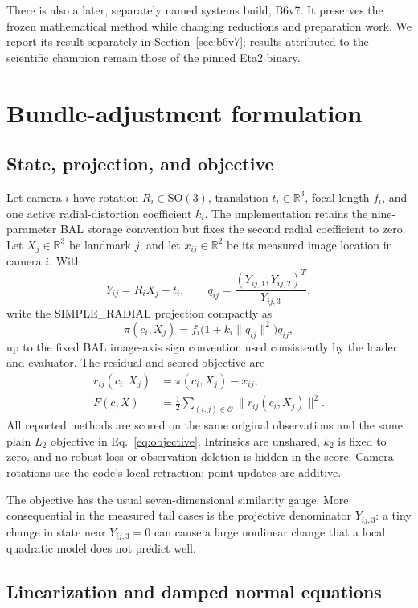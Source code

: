 \documentclass[10pt]{article}
\newcommand{\R}{\mathbb{R}}
\newcommand{\Oset}{\mathcal{O}}
\begin{document}
There is also a later, separately named systems build, B6v7.  It preserves the frozen mathematical method while changing reductions and preparation work.  We report its result separately in Section~\ref{sec:b6v7}; results attributed to the scientific champion remain those of the pinned Eta2 binary.

\section{Bundle-adjustment formulation}

\subsection{State, projection, and objective}

Let camera $i$ have rotation $R_i\in\mathrm{SO}(3)$, translation $t_i\in\R^3$, focal length $f_i$, and one active radial-distortion coefficient $k_i$.  The implementation retains the nine-parameter BAL storage convention but fixes the second radial coefficient to zero.  Let $X_j\in\R^3$ be landmark $j$, and let $x_{ij}\in\R^2$ be its measured image location in camera $i$.  With
\[
  Y_{ij}=R_iX_j+t_i,\qquad
  q_{ij}=\frac{(Y_{ij,1},Y_{ij,2})^T}{Y_{ij,3}},
\]
write the SIMPLE\_RADIAL projection compactly as
\[
  \pi(c_i,X_j)=f_i\bigl(1+k_i\lVert q_{ij}\rVert^2\bigr)q_{ij},
\]
up to the fixed BAL image-axis sign convention used consistently by the loader and evaluator.  The residual and scored objective are
\begin{align}
  r_{ij}(c_i,X_j)&=\pi(c_i,X_j)-x_{ij},\\
  F(c,X)&=\frac12\sum_{(i,j)\in\Oset}\lVert r_{ij}(c_i,X_j)\rVert^2. \label{eq:objective}
\end{align}
All reported methods are scored on the same original observations and the same plain $L_2$ objective in Eq.~\eqref{eq:objective}.  Intrinsics are unshared, $k_2$ is fixed to zero, and no robust loss or observation deletion is hidden in the score.  Camera rotations use the code's local retraction; point updates are additive.

The objective has the usual seven-dimensional similarity gauge\cite{Triggs2000}.  More consequential in the measured tail cases is the projective denominator $Y_{ij,3}$: a tiny change in state near $Y_{ij,3}=0$ can cause a large nonlinear change that a local quadratic model does not predict well.

\subsection{Linearization and damped normal equations}
\end{document}
